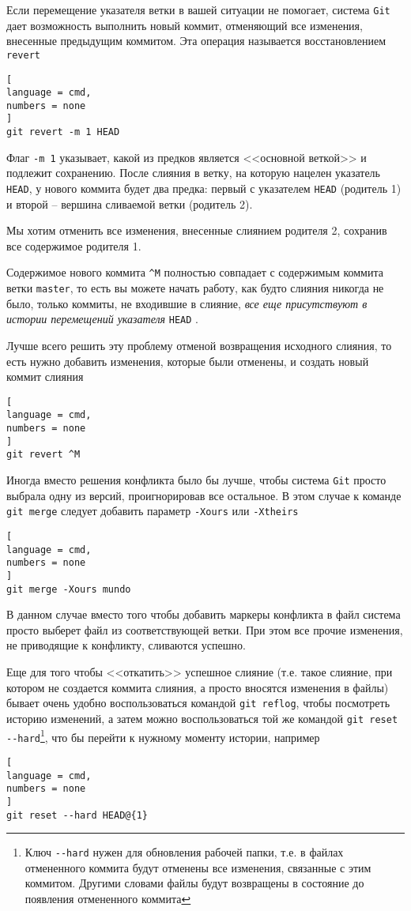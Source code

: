 \documentclass[%
	11pt,
	a4paper,
	utf8,
		]{article}
\begin{document}
Если перемещение указателя ветки в вашей ситуации не помогает, система \texttt{Git} дает возможность выполнить новый коммит, отменяющий все изменения, внесенные предыдущим коммитом. Эта операция называется восстановлением \texttt{revert}
\begin{lstlisting}[
language = cmd,
numbers = none
]
git revert -m 1 HEAD
\end{lstlisting}

Флаг \texttt{-m 1} указывает, какой из предков является <<основной веткой>> и подлежит сохранению. После слияния в ветку, на которую нацелен указатель \texttt{HEAD}, у нового коммита будет два предка: первый с указателем \texttt{HEAD} (родитель 1) и второй -- вершина сливаемой ветки (родитель 2).

Мы хотим отменить все изменения, внесенные слиянием родителя 2, сохранив все содержимое родителя 1.

Содержимое нового коммита \verb|^M| полностью совпадает с содержимым коммита ветки \texttt{master}, то есть вы можете начать работу, как будто слияния никогда не было, только коммиты, не входившие в слияние, \emph{все еще присутствуют в истории перемещений указателя} \texttt{HEAD} \cite[]{chacon:2020}.

Лучше всего решить эту проблему отменой возвращения исходного слияния, то есть нужно добавить изменения, которые были отменены, и создать новый коммит слияния
\begin{lstlisting}[
language = cmd,
numbers = none
]
git revert ^M
\end{lstlisting}

Иногда вместо решения конфликта было бы лучше, чтобы система \texttt{Git} просто выбрала одну из версий, проигнорировав все остальное. В этом случае к команде \texttt{git merge} следует добавить параметр \texttt{-Xours} или \texttt{-Xtheirs}
\begin{lstlisting}[
language = cmd,
numbers = none
]
git merge -Xours mundo
\end{lstlisting}

В данном случае вместо того чтобы добавить маркеры конфликта в файл система просто выберет файл из соответствующей ветки. При этом все прочие изменения, не приводящие к конфликту, сливаются успешно.

Еще для того чтобы <<откатить>> успешное слияние (т.е. такое слияние, при котором не создается коммита слияния, а просто вносятся изменения в файлы) бывает очень удобно воспользоваться командой \texttt{git reflog}, чтобы посмотреть историю изменений, а затем можно воспользоваться той же командой \verb|git reset --hard|\footnote{Ключ \texttt{-}\texttt{-hard} нужен для обновления рабочей папки, т.е. в файлах отмененного коммита будут отменены все изменения, связанные с этим коммитом. Другими словами файлы будут возвращены в состояние до появления отмененного коммита}, что бы перейти к нужному моменту истории, например
\begin{lstlisting}[
language = cmd,
numbers = none
]
git reset --hard HEAD@{1}
\end{lstlisting}
\end{document}
